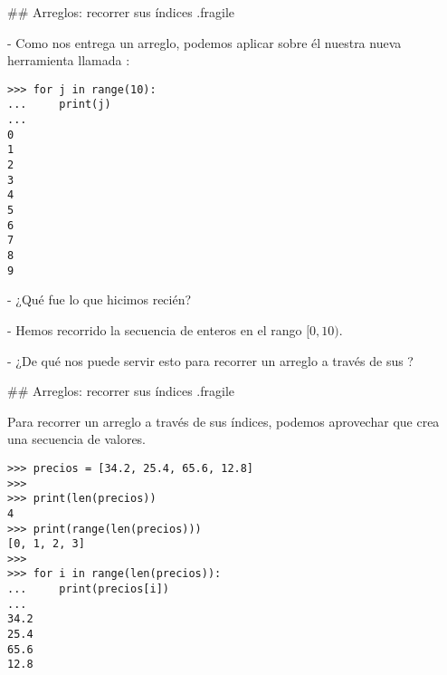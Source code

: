 \vfill

\bgnblockgood
{}
\bgncolumns[2ex]
\bgnblocknormal
{}
\trmblocknormal
{}
\bgnblocknormal
{}
\trmblocknormal
{}
\trmcolumns
\trmblockgood
{}

## Arreglos: recorrer sus índices {.fragile}

- Como  nos entrega un arreglo, podemos aplicar sobre él nuestra
nueva herramienta llamada :

\bgncolumns[-2ex]

\begin{lstlisting}[style=frame03]
>>> for j in range(10):
...     print(j)
... 
0
1
2
3
4
5
6
7
8
9
\end{lstlisting}


\pause

- ¿Qué fue lo que hicimos recién?

\pause

- Hemos recorrido la secuencia de enteros en el rango $[0, 10)$.

- ¿De qué nos puede servir esto para recorrer un arreglo a través de sus ?

\trmcolumns

## Arreglos: recorrer sus índices {.fragile}


\vspace{-2ex}
\bgncolumns
{}

\bgnblockidea
\footnotesize
Para recorrer un arreglo a través de sus índices, podemos aprovechar que 
crea una secuencia de valores.
\trmblockidea


\begin{lstlisting}[style=frame03]
>>> precios = [34.2, 25.4, 65.6, 12.8]
>>>
>>> print(len(precios))
4
>>> print(range(len(precios)))
[0, 1, 2, 3]
>>>
>>> for i in range(len(precios)):
...     print(precios[i])
... 
34.2
25.4
65.6
12.8
\end{lstlisting}

